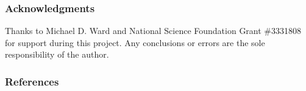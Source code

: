 \documentclass[12pt,letterpaper]{article} %
\begin{document}
\subsubsection*{Acknowledgments}

Thanks to Michael D. Ward and National Science Foundation Grant \#3331808 for support during this project. Any conclusions or errors are the sole responsibility of the author.

\subsubsection*{References}



\begingroup
\renewcommand{\section}[2]{}


\endgroup
\end{document}
